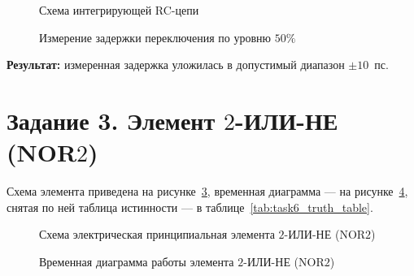 \documentclass[12pt,a4paper]{article}
\theoremstyle{plain}
\theoremstyle{definition}
\theoremstyle{remark}
\numberwithin{equation}{section}
\begin{document}
\begin{figure}[H]
    \centering
    \caption{Схема интегрирующей RC-цепи}
    \label{fig:task5_circuit}
\end{figure}

\begin{figure}[H]
    \centering
    \caption{Измерение задержки переключения по уровню $50\%$}
    \label{fig:task5_plot}
\end{figure}

\textbf{Результат:} измеренная задержка уложилась в допустимый диапазон $\pm 10$~пс.

\section{Задание 3. Элемент $2$-ИЛИ-НЕ (NOR$2$)}

Схема элемента приведена на рисунке~\ref{fig:task6_circuit}, временная диаграмма — 
на рисунке~\ref{fig:task6_plot}, снятая по ней таблица истинности — в таблице~\ref{tab:task6_truth_table}.

\begin{figure}[H]
    \centering
    \caption{Схема электрическая принципиальная элемента $2$-ИЛИ-НЕ (NOR$2$)}
    \label{fig:task6_circuit}
\end{figure}

\begin{figure}[H]
    \centering
    \caption{Временная диаграмма работы элемента $2$-ИЛИ-НЕ (NOR$2$)}
    \label{fig:task6_plot}
\end{figure}
\end{document}
